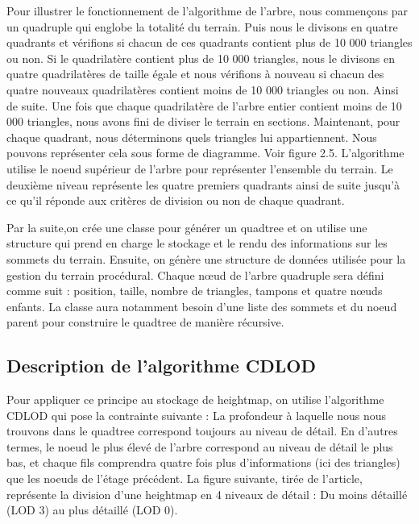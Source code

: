 \documentclass[12pt]{report}
\begin{document}
Pour illustrer le fonctionnement de l'algorithme de l'arbre, nous commençons par un quadruple qui englobe la totalité du terrain.
 Puis nous le divisons en quatre quadrants et vérifions si chacun de ces quadrants contient plus de 10 000 triangles ou non. Si le quadrilatère contient plus de 10 000 triangles, nous le divisons en quatre quadrilatères de taille égale et nous vérifions à nouveau si chacun des quatre nouveaux quadrilatères contient moins de 10 000 triangles ou non. Ainsi de suite. Une fois que chaque quadrilatère de l'arbre entier contient moins de 10 000 triangles, nous avons fini de diviser le terrain en sections. Maintenant, pour chaque quadrant, nous déterminons quels triangles lui appartiennent. Nous pouvons représenter cela sous forme de diagramme. Voir figure 2.5. L'algorithme utilise le noeud supérieur de l'arbre pour représenter l'ensemble du terrain. Le deuxième niveau représente les quatre premiers quadrants ainsi de suite jusqu'à ce qu'il réponde aux critères de division ou non de chaque quadrant.

Par la suite,on crée une classe pour générer un quadtree et on utilise une structure qui prend en charge le stockage et le rendu des informations sur les sommets du terrain.
Ensuite, on génère une structure de données utilisée pour la gestion du terrain procédural. Chaque nœud de l'arbre quadruple sera défini comme suit : position, taille, nombre de triangles, tampons et quatre nœuds enfants.
La classe aura notamment besoin d'une liste des sommets et du noeud parent pour construire le quadtree de manière récursive.


\subsection{Description de l'algorithme CDLOD}

Pour appliquer ce principe au stockage de heightmap, on utilise l'algorithme CDLOD qui pose la contrainte suivante : La profondeur à laquelle nous nous trouvons dans le quadtree correspond toujours au niveau de détail. En d'autres termes, le noeud le plus élevé de l'arbre correspond au niveau de détail le plus bas, et chaque fils comprendra quatre fois plus d'informations (ici des triangles) que les noeuds de l'étage précédent. La figure suivante, tirée de l'article, représente la division d'une heightmap en 4 niveaux de détail : Du moins détaillé (LOD 3) au plus détaillé (LOD 0).

\vspace{0.3cm}
\end{document}
